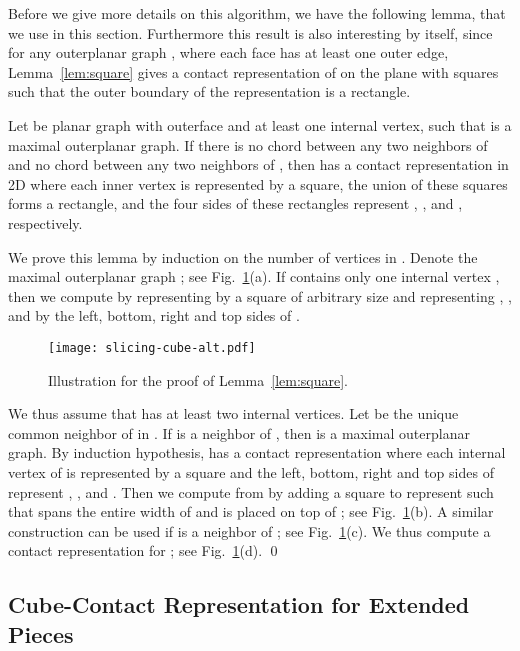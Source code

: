 \documentclass{llncs}
\renewenvironment{proof}{\medskip\noindent{\bf Proof:}}{\mbox{}\hfill\qed\par}
\begin{document}
Before we give more details on this algorithm, we have the following lemma, that we use in this section.
 Furthermore this result is also interesting by itself, since for any outerplanar graph , where each
 face has at least one outer edge, Lemma~\ref{lem:square} gives a contact representation of  on
 the plane with squares such that the outer boundary of the representation is a rectangle.



\begin{lemma}
	\label{lem:square} Let  be planar graph with outerface  and at least one
	internal vertex, such that  is a maximal outerplanar graph. If there is no
	chord between any two neighbors of  and no chord between any two neighbors of
	, then  has a contact representation  in 2D where each inner vertex
	is represented by a square, the union of these squares forms a rectangle,
	and the four sides of these rectangles represent , ,  and , respectively.
\end{lemma}
\begin{proof}
 We prove this lemma by induction on the number of vertices in . Denote the
 maximal outerplanar graph ; see Fig.~\ref{fig:square}(a). If  contains
 only one internal vertex , then we compute  by
 representing  by a square  of arbitrary size and representing , , 
 and  by the left, bottom, right and top sides of .


\begin{figure}[t]
\centering
	\texttt{[image: slicing-cube-alt.pdf]}
	\caption{Illustration for the proof of Lemma~\ref{lem:square}.}
	\label{fig:square}
\end{figure}


 We thus assume that  has at least two internal vertices. Let  be the unique common
 neighbor of  in . If  is a neighbor of , then  is a maximal
 outerplanar graph. By induction hypothesis,  has a contact representation
  where each internal vertex of  is represented by a square and the left,
 bottom, right and top sides of  represent , ,  and . Then we
 compute  from  by adding a square  to represent  such
 that  spans the entire width of  and is placed on top of ; see
 Fig.~\ref{fig:square}(b). A similar construction can be used if  is a neighbor of ; see
Fig.~\ref{fig:square}(c).
We thus compute a contact representation for ; see Fig.~\ref{fig:square}(d).
\end{proof}





\subsection{Cube-Contact Representation for Extended Pieces}
\end{document}
